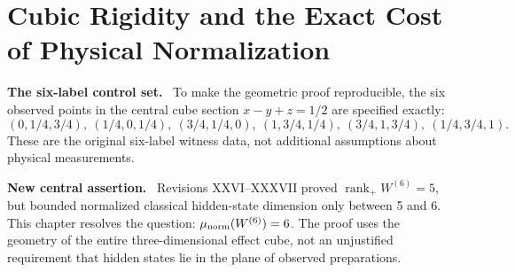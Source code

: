 \documentclass[11pt,a4paper,oneside]{book}
\DeclareMathOperator{\rank}{rank}\DeclareMathOperator{\Tr}{Tr}
\newcommand{\note}[1]{\par\medskip\noindent\textbf{#1}\ }
\begin{document}
\chapter{Cubic Rigidity and the Exact Cost of Physical Normalization}
\note{The six-label control set.} To make the geometric proof reproducible, the six observed points in the central cube section $x-y+z=1/2$ are specified exactly:
\[(0,1/4,3/4),\ (1/4,0,1/4),\ (3/4,1/4,0),\ (1,3/4,1/4),\ (3/4,1,3/4),\ (1/4,3/4,1).\]
These are the original six-label witness data, not additional assumptions about physical measurements.

\note{New central assertion.} Revisions XXVI--XXXVII proved $\rank_+W^{(6)}=5$, but bounded normalized classical hidden-state dimension only between 5 and 6. This chapter resolves the question: $\mu_{\rm norm}(W^{(6)})=6$. The proof uses the geometry of the entire three-dimensional effect cube, not an unjustified requirement that hidden states lie in the plane of observed preparations.
\end{document}
